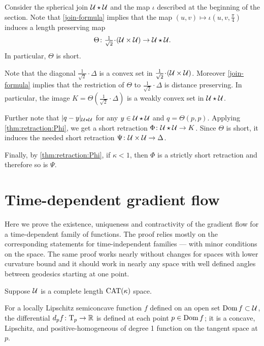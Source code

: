 \documentclass[oneside,a4paper, 12pt]{article}
\begin{document}
Consider the spherical join $\mathcal{U}\star\mathcal{U}$ and the map $\iota$ described at the beginning of the section. 
Note that \ref{join-formula} implies that the map $(u,v)\mapsto \iota(u,v,\tfrac\pi4)$
induces a length preserving map 
\[\Theta\:{\tfrac1{\sqrt{2}}}\cdot(\spc{U}\times\spc{U})\to\spc{U}\star\spc{U}.\]
In particular, $\Theta$ is short.

Note that the diagonal $\tfrac1{\sqrt{2}}\cdot\Delta$ is a convex set in $\tfrac1{\sqrt{2}}\cdot(\spc{U}\times\spc{U})$.
Moreover \ref{join-formula} implies that the restriction of $\Theta$ to $\tfrac1{\sqrt{2}}\cdot\Delta$ is distance preserving.
In particular, the image $K=\Theta(\tfrac1{\sqrt{2}}\cdot\Delta)$ is a weakly convex set in $\mathcal{U}\star\mathcal{U}$.

Further note that $|q-y|_{\mathcal{U}\star\mathcal{U}}$ for any $y\in \mathcal{U}\star\mathcal{U}$ and $q=\Theta(p,p)$.
Applying \ref{thm:retraction:Phi}, we get a short retraction $\Phi\colon\mathcal{U}\star\mathcal{U}\to K$.
Since $\Theta$ is short, it induces the needed short retraction $\Psi\colon\mathcal{U}\times\mathcal{U}\to \Delta$.

Finally, by \ref{thm:retraction:Phi}, if $\kappa<1$, then $\Phi$ is a strictly short retraction and therefore so is $\Psi$.
\qeds

\appendix
\section{Time-dependent gradient flow}

Here we prove the existence, uniqueness and contractivity  of the gradient flow for a time-dependent family of functions.
The proof relies mostly on the corresponding statements  for time-independent families --- with minor conditions on the space.
The same  proof works nearly without changes for spaces with lower curvature bound
and it should work in nearly any space with well defined angles between geodesics starting at one point.

Suppose $\mathcal{U}$ is a complete length $\mathrm{CAT}(\kappa)$ space.

For a locally Lipschitz semiconcave function $f$ defined on an open set $\mathop{\rm Dom}\nolimits f\subset \mathcal{U}$, the differential $d_pf\colon\mathrm{T}_p\to\mathbb{R}$ is defined at each point $p\in \mathop{\rm Dom}\nolimits f$;
it is a concave, Lipschitz, and positive-homogeneous of degree 1 function on the tangent space at $p$. %
\end{document}
